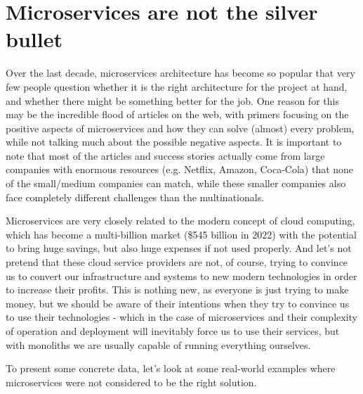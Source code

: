 \section{Microservices are not the silver bullet}
Over the last decade, microservices architecture has become so popular that very few people question whether it is the right architecture for the project at hand, and whether there might be something better for the job. One reason for this may be the incredible flood of articles on the web, with primers focusing on the positive aspects of microservices and how they can solve (almost) every problem, while not talking much about the possible negative aspects. It is important to note that most of the articles and success stories actually come from large companies with enormous resources (e.g. Netflix, Amazon, Coca-Cola) that none of the small/medium companies can match, while these smaller companies also face completely different challenges than the multinationals.

Microservices are very closely related to the modern concept of cloud computing, which has become a multi-billion market (\$545 billion in 2022\cite{CC_MARKET_SIZE}) with the potential to bring huge savings, but also huge expenses if not used properly. And let's not pretend that these cloud service providers are not, of course, trying to convince us to convert our infrastructure and systems to new modern technologies in order to increase their profits. This is nothing new, as everyone is just trying to make money, but we should be aware of their intentions when they try to convince us to use their technologies - which in the case of microservices and their complexity of operation and deployment will inevitably force us to use their services, but with monoliths we are usually capable of running everything ourselves.

To present some concrete data, let's look at some real-world examples where microservices were not considered to be the right solution.

